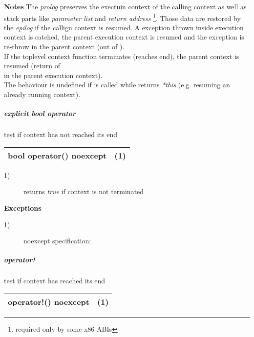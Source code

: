 {\bfseries Notes}
\newline
The \emph{prolog} preserves the exectuin context of the calling context as well
as stack parts like \emph{parameter list} and \emph{return address}
\footnote{required only by some x86 ABIs}. Those data are restored by the
\emph{epilog} if the callign context is resumed.
\newline
A exception thrown inside execution context is catched, the parent execution
context is resumed and the exception is re-throw in the parent context (out of
\ectxop).\\
If the toplevel context function terminates (reaches end), the parent context is
resumed (return of\\
\ectxop in the parent execution context).\\
The behaviour is undefined if  is called while 
returns \emph{*this} (e.g. resuming an already running context).

\subparagraph*{explicit bool operator}
test if context has not reached its end\\

\begin{tabular}{ l l }
    \midrule

    {\ttfamily\small\color{black}{\color{blue}explicit} {\color{blue}bool} {\color{blue}operator}() {\color{blue}noexcept}} & (1)\\

    \midrule
\end{tabular}

\begin{description}
    \item[1)] returns \emph{true} if context is not terminated\\
\end{description}

{\bfseries Exceptions}
\begin{description}
    \item[1)] noexcept specification: \\
\end{description}

\subparagraph*{operator!}
test if context has reached its end\\

\begin{tabular}{ l l }
    \midrule

    {\ttfamily\small\color{black}{\color{blue}bool} {\color{blue}operator}!() {\color{blue}noexcept}} & (1)\\

    \midrule
\end{tabular}

